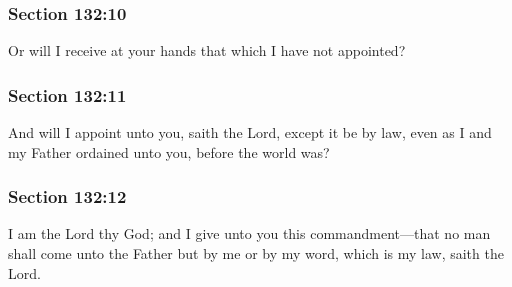
	\subsubsection{Section 132:10} %
		\label{DC132-10}

		Or will I receive at your hands that which I have not appointed?


	\subsubsection{Section 132:11} %
		\label{DC132-11}

		And will I appoint unto you, saith the Lord, except it be by law, even as I and my Father ordained unto you, before the world was?


	\subsubsection{Section 132:12} %
		\label{DC132-12}

		I am the Lord thy God; and I give unto you this commandment---that no man shall come unto the Father but by me or by my word, which is my law, saith the Lord.

